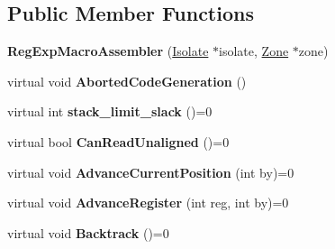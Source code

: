 \subsection*{Public Member Functions}
\begin{DoxyCompactItemize}
\item 
{\bfseries Reg\+Exp\+Macro\+Assembler} (\hyperlink{classv8_1_1internal_1_1_isolate}{Isolate} $\ast$isolate, \hyperlink{classv8_1_1internal_1_1_zone}{Zone} $\ast$zone)\hypertarget{classv8_1_1internal_1_1_reg_exp_macro_assembler_aa4fc46f0406a21347225142b47201327}{}\label{classv8_1_1internal_1_1_reg_exp_macro_assembler_aa4fc46f0406a21347225142b47201327}

\item 
virtual void {\bfseries Aborted\+Code\+Generation} ()\hypertarget{classv8_1_1internal_1_1_reg_exp_macro_assembler_a3fdb2dd4ace9521cee0995f9e3c2b29e}{}\label{classv8_1_1internal_1_1_reg_exp_macro_assembler_a3fdb2dd4ace9521cee0995f9e3c2b29e}

\item 
virtual int {\bfseries stack\+\_\+limit\+\_\+slack} ()=0\hypertarget{classv8_1_1internal_1_1_reg_exp_macro_assembler_ac8301db0110b57d8ee371480fd2f0475}{}\label{classv8_1_1internal_1_1_reg_exp_macro_assembler_ac8301db0110b57d8ee371480fd2f0475}

\item 
virtual bool {\bfseries Can\+Read\+Unaligned} ()=0\hypertarget{classv8_1_1internal_1_1_reg_exp_macro_assembler_ac12553b824b0bd97c2cce6d8637a6fd7}{}\label{classv8_1_1internal_1_1_reg_exp_macro_assembler_ac12553b824b0bd97c2cce6d8637a6fd7}

\item 
virtual void {\bfseries Advance\+Current\+Position} (int by)=0\hypertarget{classv8_1_1internal_1_1_reg_exp_macro_assembler_abd0e490196a7e5485e6f4f024d35688f}{}\label{classv8_1_1internal_1_1_reg_exp_macro_assembler_abd0e490196a7e5485e6f4f024d35688f}

\item 
virtual void {\bfseries Advance\+Register} (int reg, int by)=0\hypertarget{classv8_1_1internal_1_1_reg_exp_macro_assembler_aebf719b9944a4a6be84c46d5554e8283}{}\label{classv8_1_1internal_1_1_reg_exp_macro_assembler_aebf719b9944a4a6be84c46d5554e8283}

\item 
virtual void {\bfseries Backtrack} ()=0\hypertarget{classv8_1_1internal_1_1_reg_exp_macro_assembler_a5dcae018cbb0d117c0ccd0062ecf67ef}{}\label{classv8_1_1internal_1_1_reg_exp_macro_assembler_a5dcae018cbb0d117c0ccd0062ecf67ef}


\end{DoxyCompactItemize}
